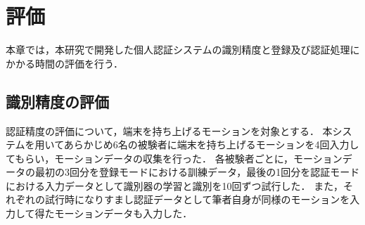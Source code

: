 \chapter{評価}
本章では，本研究で開発した個人認証システムの識別精度と登録及び認証処理にかかる時間の評価を行う．

\section{識別精度の評価}
認証精度の評価について，端末を持ち上げるモーションを対象とする．
本システムを用いてあらかじめ6名の被験者に端末を持ち上げるモーションを4回入力してもらい，モーションデータの収集を行った．
各被験者ごとに，モーションデータの最初の3回分を登録モードにおける訓練データ，最後の1回分を認証モードにおける入力データとして識別器の学習と識別を10回ずつ試行した．
また，それぞれの試行時になりすまし認証データとして筆者自身が同様のモーションを入力して得たモーションデータも入力した．


